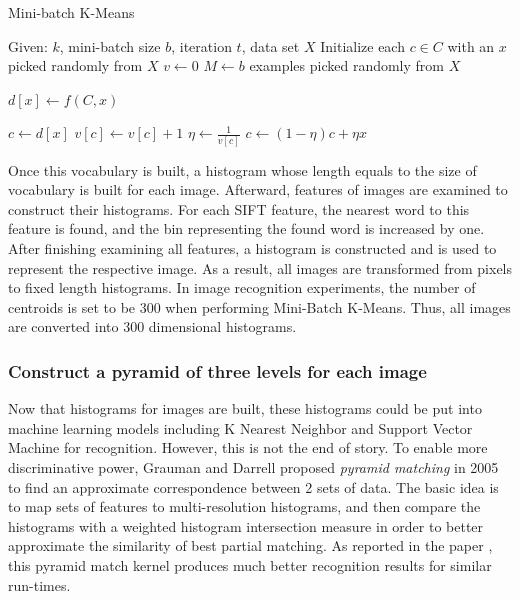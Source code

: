 \begin{algorithm}
  \caption{Mini-batch K-Means}
  \begin{algorithmic}[1]
  \State Given: $k$, mini-batch size $b$, iteration $t$, data set $X$
  \State Initialize each $c \in C$ with an $x$ picked randomly from $X$
  \State $v \gets 0$
  \State $M \gets b$ examples picked randomly from $X$
  
  \State $d[x] \gets f(C, x)$ 
  \EndFor

  \State $c \gets d[x]$ 
  \State $v[c] \gets v[c] + 1$ 
  \State $\eta \gets \frac{1}{v[c]}$ 
  \State $c \gets (1 - \eta)c + \eta x$ 
  \EndFor
  
  \EndFor
  \end{algorithmic}
\end{algorithm}

\noindent Once this vocabulary is built, a histogram whose length equals to the size of vocabulary is built for each image. Afterward, features of images are examined to construct their histograms. For each SIFT feature, the nearest word to this feature is found, and the bin representing the found word is increased by one. After finishing examining all features, a histogram is constructed and is used to represent the respective image. As a result, all images are transformed from pixels to fixed length histograms. In image recognition experiments, the number of centroids is set to be 300 when performing Mini-Batch K-Means. Thus, all images are converted into 300 dimensional histograms. 

\subsubsection{Construct a pyramid of three levels for each image}
Now that histograms for images are built, these histograms could be put into machine learning models including K Nearest Neighbor and Support Vector Machine for recognition. However, this is not the end of story. To enable more discriminative power, Grauman and Darrell \cite{grauman2005pyramid} proposed {\em pyramid matching} in 2005 to find an approximate correspondence between 2 sets of data. The basic idea is to map sets of features to multi-resolution histograms, and then compare the histograms with a weighted histogram intersection measure in order to better approximate the similarity of best partial matching. As reported in the paper \cite{grauman2005pyramid}, this pyramid match kernel produces much better recognition results for similar run-times. \\

